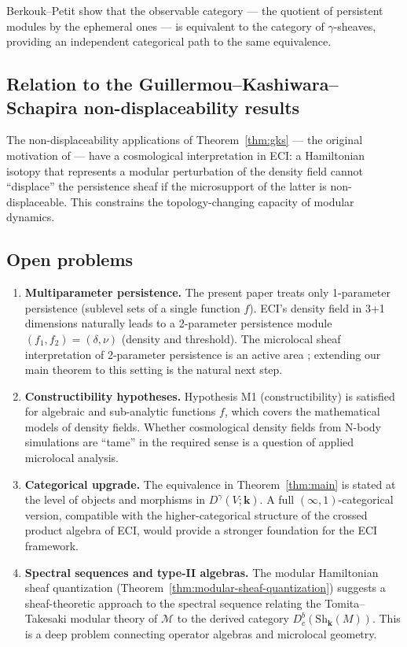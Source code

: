 \documentclass[12pt,a4paper]{amsart}
\theoremstyle{definition}
\newcommand{\kk}{\mathbf{k}}                %
\newcommand{\Sh}{\mathrm{Sh}}               %
\newcommand{\Dbc}{D^b_c}                     %
\newcommand{\Dgamma}{D^\gamma}              %
\begin{document}
Berkouk--Petit \cite{BP2021} show that the observable category --- the
quotient of persistent modules by the ephemeral ones --- is equivalent to
the category of $\gamma$-sheaves, providing an independent categorical
path to the same equivalence.

\subsection{Relation to the Guillermou--Kashiwara--Schapira non-displaceability results}

The non-displaceability applications of Theorem~\ref{thm:gks} --- the
original motivation of \cite{GKS2012} --- have a cosmological
interpretation in ECI: a Hamiltonian isotopy that represents a modular
perturbation of the density field cannot ``displace'' the persistence
sheaf if the microsupport of the latter is non-displaceable.  This
constrains the topology-changing capacity of modular dynamics.

\subsection{Open problems}

\begin{enumerate}
  \item[(O1)]
    \textbf{Multiparameter persistence.}
    The present paper treats only 1-parameter persistence (sublevel sets
    of a single function $f$).  ECI's density field in 3+1 dimensions
    naturally leads to a 2-parameter persistence module
    $(f_1, f_2) = (\delta, \nu)$ (density and threshold).  The
    microlocal sheaf interpretation of 2-parameter persistence is an
    active area \cite{BGO2019}; extending our main theorem to this
    setting is the natural next step.

  \item[(O2)]
    \textbf{Constructibility hypotheses.}
    Hypothesis M1 (constructibility) is satisfied for algebraic and
    sub-analytic functions $f$, which covers the mathematical models of
    density fields.  Whether cosmological density fields from N-body
    simulations are ``tame'' in the required sense is a question of
    applied microlocal analysis.

  \item[(O3)]
    \textbf{Categorical upgrade.}
    The equivalence in Theorem~\ref{thm:main} is stated at the level of
    objects and morphisms in $\Dgamma(V;\kk)$.  A full $(\infty,1)$-categorical
    version, compatible with the higher-categorical structure of the
    crossed product algebra of ECI, would provide a stronger foundation
    for the ECI framework.

  \item[(O4)]
    \textbf{Spectral sequences and type-II algebras.}
    The modular Hamiltonian sheaf quantization
    (Theorem~\ref{thm:modular-sheaf-quantization}) suggests a sheaf-theoretic
    approach to the spectral sequence relating the Tomita--Takesaki modular
    theory of $\mathcal{M}$ to the derived category $\Dbc(\Sh_\kk(M))$.
    This is a deep problem connecting operator algebras and microlocal
    geometry.
\end{enumerate}
\end{document}
